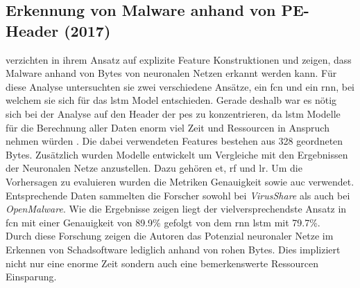 \documentclass[
    12pt, %
    DIV10,
    ngerman, %
    a4paper, %
    oneside, %
    titlepage, %
    parskip=half, %
    headings=normal, %
    listof=totoc, %
    bibliography=totoc, %
    index=totoc, %
    captions=tableheading, %
    final %
]{scrreprt}
\begin{document}
\subsection{Erkennung von Malware anhand von PE-Header (2017)}
\textcite{Raff2017} verzichten in ihrem Ansatz auf explizite Feature Konstruktionen und zeigen, dass Malware anhand von Bytes von neuronalen Netzen erkannt werden kann. 
Für diese Analyse untersuchten sie zwei verschiedene Ansätze, ein \ac{fcn} und ein \ac{rnn}, bei welchem sie sich für das \ac{lstm} Model entschieden. Gerade deshalb war es nötig sich bei der Analyse auf den Header der \ac{pes} zu konzentrieren, da \ac{lstm} Modelle für die Berechnung aller Daten enorm viel Zeit und Ressourcen in Anspruch nehmen würden \parencite{Raff2017}. Die dabei verwendeten Features bestehen aus 328 geordneten Bytes.
Zusätzlich wurden Modelle entwickelt um Vergleiche mit den Ergebnissen der Neuronalen Netze anzustellen. Dazu gehören \ac{et}, \ac{rf} und \ac{lr}. Um die Vorhersagen zu evaluieren wurden die Metriken Genauigkeit sowie \ac{auc} verwendet. Entsprechende Daten sammelten die Forscher sowohl bei \emph{VirusShare} als auch bei \emph{OpenMalware}. Wie die Ergebnisse zeigen liegt der vielversprechendste Ansatz in \ac{fcn} mit einer Genauigkeit von 89.9\% gefolgt von dem \ac{rnn} \ac{lstm} mit 79.7\%.\\
Durch diese Forschung zeigen die Autoren das Potenzial neuronaler Netze im Erkennen von Schadsoftware lediglich anhand von rohen Bytes. Dies impliziert nicht nur eine enorme Zeit sondern auch eine bemerkenswerte Ressourcen Einsparung.
%
\end{document}

